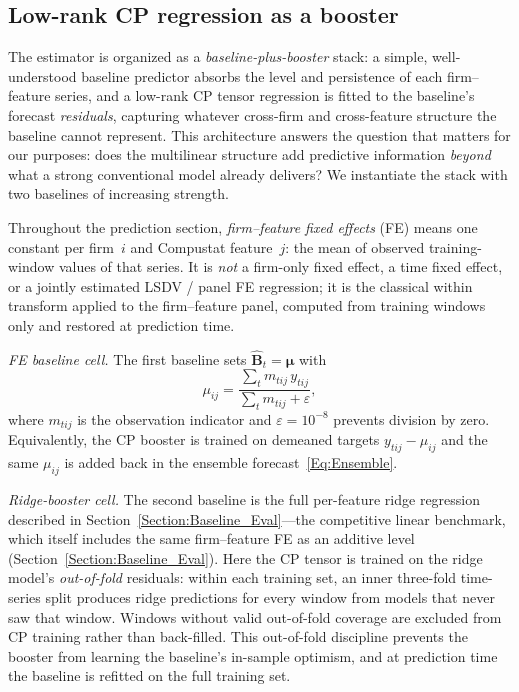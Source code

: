 \documentclass[pdflatex,sn-mathphys-num]{sn-jnl}%
\theoremstyle{thmstyleone}%
\theoremstyle{thmstyletwo}%
\theoremstyle{thmstylethree}%
\begin{document}
\subsection{Low-rank CP regression as a booster}
\label{Section:CP_Structured}

The estimator is organized as a \emph{baseline-plus-booster} stack: a simple, well-understood baseline predictor absorbs the level and persistence of each firm--feature series, and a low-rank CP tensor regression is fitted to the baseline's forecast \emph{residuals}, capturing whatever cross-firm and cross-feature structure the baseline cannot represent. This architecture answers the question that matters for our purposes: does the multilinear structure add predictive information \emph{beyond} what a strong conventional model already delivers? We instantiate the stack with two baselines of increasing strength.

Throughout the prediction section, \emph{firm--feature fixed effects} (FE) means one constant per firm~$i$ and Compustat feature~$j$: the mean of observed training-window values of that series. It is \emph{not} a firm-only fixed effect, a time fixed effect, or a jointly estimated LSDV / panel FE regression; it is the classical within transform applied to the firm--feature panel, computed from training windows only and restored at prediction time.

\textit{FE baseline cell.} The first baseline sets $\widehat{\mathbf{B}}_t = \boldsymbol{\mu}$ with
\begin{equation}
\mu_{ij} = \frac{\sum_{t} m_{tij}\, y_{tij}}{\sum_{t} m_{tij} + \varepsilon},
\end{equation}
where $m_{tij}$ is the observation indicator and $\varepsilon = 10^{-8}$ prevents division by zero. Equivalently, the CP booster is trained on demeaned targets $y_{tij}-\mu_{ij}$ and the same $\mu_{ij}$ is added back in the ensemble forecast~\eqref{Eq:Ensemble}.

\textit{Ridge-booster cell.} The second baseline is the full per-feature ridge regression described in Section~\ref{Section:Baseline_Eval}---the competitive linear benchmark, which itself includes the same firm--feature FE as an additive level (Section~\ref{Section:Baseline_Eval}). Here the CP tensor is trained on the ridge model's \emph{out-of-fold} residuals: within each training set, an inner three-fold time-series split produces ridge predictions for every window from models that never saw that window. Windows without valid out-of-fold coverage are excluded from CP training rather than back-filled. This out-of-fold discipline prevents the booster from learning the baseline's in-sample optimism, and at prediction time the baseline is refitted on the full training set.
\end{document}
